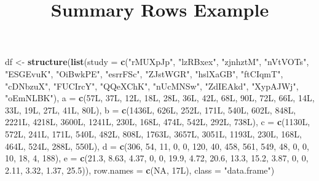 \documentclass[]{article}
\title{Summary Rows Example}
\author{}
\date{\vspace{-2.5em}}
\newenvironment{Shaded}{\begin{snugshade}}{\end{snugshade}}
\newcommand{\DataTypeTok}[1]{\textcolor[rgb]{0.13,0.29,0.53}{#1}}
\newcommand{\DecValTok}[1]{\textcolor[rgb]{0.00,0.00,0.81}{#1}}
\newcommand{\FloatTok}[1]{\textcolor[rgb]{0.00,0.00,0.81}{#1}}
\newcommand{\KeywordTok}[1]{\textcolor[rgb]{0.13,0.29,0.53}{\textbf{#1}}}
\newcommand{\NormalTok}[1]{#1}
\newcommand{\OtherTok}[1]{\textcolor[rgb]{0.56,0.35,0.01}{#1}}
\newcommand{\StringTok}[1]{\textcolor[rgb]{0.31,0.60,0.02}{#1}}
\begin{document}
\maketitle

\begin{Shaded}
\begin{Highlighting}[]
\NormalTok{df <-}\StringTok{ }\KeywordTok{structure}\NormalTok{(}\KeywordTok{list}\NormalTok{(}\DataTypeTok{study =} \KeywordTok{c}\NormalTok{(}\StringTok{"rMUXpJp"}\NormalTok{, }\StringTok{"lzRBxex"}\NormalTok{, }\StringTok{"zjnhztM"}\NormalTok{, }\StringTok{"nVtVOTs"}\NormalTok{, }
\StringTok{"ESGEvuK"}\NormalTok{, }\StringTok{"OiBwkPE"}\NormalTok{, }\StringTok{"esrrFSc"}\NormalTok{, }\StringTok{"ZJstWGR"}\NormalTok{, }\StringTok{"hslXaGB"}\NormalTok{, }\StringTok{"ftCIqmT"}\NormalTok{, }
\StringTok{"cDNbzuX"}\NormalTok{, }\StringTok{"FUCIrcY"}\NormalTok{, }\StringTok{"QQeXChK"}\NormalTok{, }\StringTok{"nUcMNSw"}\NormalTok{, }\StringTok{"ZdIEAkd"}\NormalTok{, }\StringTok{"XypAJWj"}\NormalTok{, }
\StringTok{"oEmNLBK"}\NormalTok{), }\DataTypeTok{a =} \KeywordTok{c}\NormalTok{(57L, 37L, 12L, 18L, 28L, 36L, 42L, 68L, 90L, }
\NormalTok{72L, 66L, 14L, 33L, 19L, 27L, 41L, 80L), }\DataTypeTok{b =} \KeywordTok{c}\NormalTok{(1436L, 626L, 252L, }
\NormalTok{171L, 540L, 602L, 848L, 2221L, 4218L, 3600L, 1241L, 230L, 168L, }
\NormalTok{474L, 542L, 292L, 738L), }\DataTypeTok{c =} \KeywordTok{c}\NormalTok{(1130L, 572L, 241L, 171L, 540L, }
\NormalTok{482L, 808L, 1763L, 3657L, 3051L, 1193L, 230L, 168L, 464L, 524L, }
\NormalTok{288L, 550L), }\DataTypeTok{d =} \KeywordTok{c}\NormalTok{(}\DecValTok{306}\NormalTok{, }\DecValTok{54}\NormalTok{, }\DecValTok{11}\NormalTok{, }\DecValTok{0}\NormalTok{, }\DecValTok{0}\NormalTok{, }\DecValTok{120}\NormalTok{, }\DecValTok{40}\NormalTok{, }\DecValTok{458}\NormalTok{, }\DecValTok{561}\NormalTok{, }\DecValTok{549}\NormalTok{, }
\DecValTok{48}\NormalTok{, }\DecValTok{0}\NormalTok{, }\DecValTok{0}\NormalTok{, }\DecValTok{10}\NormalTok{, }\DecValTok{18}\NormalTok{, }\DecValTok{4}\NormalTok{, }\DecValTok{188}\NormalTok{), }\DataTypeTok{e =} \KeywordTok{c}\NormalTok{(}\FloatTok{21.3}\NormalTok{, }\FloatTok{8.63}\NormalTok{, }\FloatTok{4.37}\NormalTok{, }\DecValTok{0}\NormalTok{, }\DecValTok{0}\NormalTok{, }\FloatTok{19.9}\NormalTok{, }
\FloatTok{4.72}\NormalTok{, }\FloatTok{20.6}\NormalTok{, }\FloatTok{13.3}\NormalTok{, }\FloatTok{15.2}\NormalTok{, }\FloatTok{3.87}\NormalTok{, }\DecValTok{0}\NormalTok{, }\DecValTok{0}\NormalTok{, }\FloatTok{2.11}\NormalTok{, }\FloatTok{3.32}\NormalTok{, }\FloatTok{1.37}\NormalTok{, }\FloatTok{25.5}\NormalTok{)), }\DataTypeTok{row.names =} \KeywordTok{c}\NormalTok{(}\OtherTok{NA}\NormalTok{, }
\NormalTok{17L), }\DataTypeTok{class =} \StringTok{"data.frame"}\NormalTok{)}
\end{Highlighting}
\end{Shaded}
\end{document}
